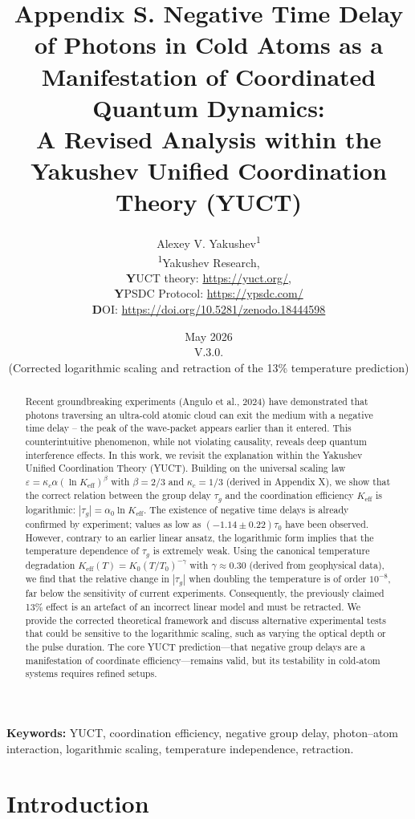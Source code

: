 \documentclass[12pt,a4paper]{article}
\title{\textbf{Appendix S. Negative Time Delay of Photons in Cold Atoms as a Manifestation of Coordinated Quantum Dynamics: \\ A Revised Analysis within the Yakushev Unified Coordination Theory (YUCT)}}
\author{Alexey V. Yakushev\textsuperscript{1} \\
	\textsuperscript{1}Yakushev Research, \\ 
	\textbf YUCT theory: \url{https://yuct.org/}, \\ 
	\textbf YPSDC Protocol: \url{https://ypsdc.com/}\\
	\textbf DOI: \url{https://doi.org/10.5281/zenodo.18444598}\\
}
\date{May 2026 \\ \large V.3.0. \\(Corrected logarithmic scaling and retraction of the 13\% temperature prediction)}
\newcommand{\Keff}{K_{\mathrm{eff}}}
\newcommand{\kappac}{\kappa_c}
\newcommand{\eps}{\varepsilon}
\newcommand{\betac}{\beta}
\begin{document}
	
	\maketitle
	\newpage
	\begin{abstract}
		Recent groundbreaking experiments (Angulo et al., 2024) have demonstrated that photons traversing an ultra-cold atomic cloud can exit the medium with a negative time delay – the peak of the wave‑packet appears earlier than it entered. This counterintuitive phenomenon, while not violating causality, reveals deep quantum interference effects. In this work, we revisit the explanation within the Yakushev Unified Coordination Theory (YUCT). Building on the universal scaling law \(\eps = \kappac \alpha (\ln\Keff)^{\betac}\) with \(\betac = 2/3\) and \(\kappac = 1/3\) (derived in Appendix X), we show that the correct relation between the group delay \(\tau_g\) and the coordination efficiency \(\Keff\) is logarithmic: \(|\tau_g| = \alpha_0 \ln\Keff\). The existence of negative time delays is already confirmed by experiment; values as low as \((-1.14 \pm 0.22)\tau_0\) have been observed. However, contrary to an earlier linear ansatz, the logarithmic form implies that the temperature dependence of \(\tau_g\) is extremely weak. Using the canonical temperature degradation \(\Keff(T) = K_0 (T/T_0)^{-\gamma}\) with \(\gamma \approx 0.30\) (derived from geophysical data), we find that the relative change in \(|\tau_g|\) when doubling the temperature is of order \(10^{-8}\), far below the sensitivity of current experiments. Consequently, the previously claimed 13\% effect is an artefact of an incorrect linear model and must be retracted. We provide the corrected theoretical framework and discuss alternative experimental tests that could be sensitive to the logarithmic scaling, such as varying the optical depth or the pulse duration. The core YUCT prediction—that negative group delays are a manifestation of coordinate efficiency—remains valid, but its testability in cold‑atom systems requires refined setups.
	\end{abstract}
	
	\noindent\textbf{Keywords:} YUCT, coordination efficiency, negative group delay, photon–atom interaction, logarithmic scaling, temperature independence, retraction.
	
	\newpage
	\tableofcontents
	\newpage
	
	\section{Introduction}
	
\end{document}
